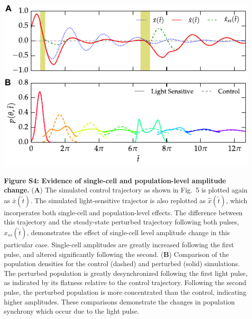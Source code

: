 \documentclass[11pt, letterpaper]{article}
\newenvironment{manuscript}[1]{\begin{center}\begin{tcolorbox}[colback=green!5!white,colframe=green!75!black,width=0.8\textwidth,title={#1},breakable,fonttitle=\bfseries]}{\end{tcolorbox}\end{center}}
\begin{document}
\begin{manuscript}{Supplemental Info, Page 7}
  \begin{center}
    \includegraphics[width=.85\textwidth]{figures/figure_S4.pdf}\\
  \end{center}
{\bfseries Figure S4: Evidence of single-cell and population-level amplitude change.}
({\bfseries A}) The simulated control trajectory as shown in Fig.~5 is plotted again as $\bar{x}(\tilde{t})$.
The simulated light-sensitive trajector is also replotted as $\hat{x}(\tilde{t})$, which incorperates both single-cell and population-level effects.
The difference between this trajectory and the steady-state perturbed trajectory following both pulses, $\hat{x}_{ss}(\tilde{t})$, demonstrates the effect of single-cell level amplitude change in this particular case. 
Single-cell amplitudes are greatly increased following the first pulse, and altered significantly following the second.
({\bfseries B})
Comparison of the population densities for the control (dashed) and perturbed (solid) simulations.
The perturbed population is greatly desynchronized following the first light pulse, as indicated by its flatness relative to the control trajectory. 
Following the second pulse, the perturbed population is more concentrated than the control, indicating higher amplitudes. 
These comparisons demonstrate the changes in population synchrony which occur due to the light pulse. 
\end{manuscript}
\end{document}
